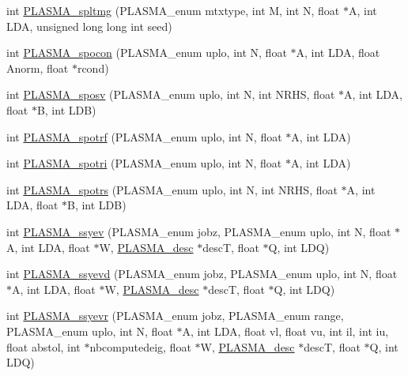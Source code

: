\begin{DoxyCompactItemize}
\item 
int \hyperlink{group__float_gaf78afc5a8cd9c1f43eb9cfecd9c0f7a1_gaf78afc5a8cd9c1f43eb9cfecd9c0f7a1}{P\+L\+A\+S\+M\+A\+\_\+spltmg} (P\+L\+A\+S\+M\+A\+\_\+enum mtxtype, int M, int N, float $\ast$A, int L\+D\+A, unsigned long long int seed)
\item 
int \hyperlink{group__float_gae4ca020dbb8fa3516e2e4c89a6b60b1a_gae4ca020dbb8fa3516e2e4c89a6b60b1a}{P\+L\+A\+S\+M\+A\+\_\+spocon} (P\+L\+A\+S\+M\+A\+\_\+enum uplo, int N, float $\ast$A, int L\+D\+A, float Anorm, float $\ast$rcond)
\item 
int \hyperlink{group__float_ga113c09b4a9f41fc4c19358a52477d685_ga113c09b4a9f41fc4c19358a52477d685}{P\+L\+A\+S\+M\+A\+\_\+sposv} (P\+L\+A\+S\+M\+A\+\_\+enum uplo, int N, int N\+R\+H\+S, float $\ast$A, int L\+D\+A, float $\ast$B, int L\+D\+B)
\item 
int \hyperlink{group__float_ga3ada27ebefe8e378bc6f9d25ab72d217_ga3ada27ebefe8e378bc6f9d25ab72d217}{P\+L\+A\+S\+M\+A\+\_\+spotrf} (P\+L\+A\+S\+M\+A\+\_\+enum uplo, int N, float $\ast$A, int L\+D\+A)
\item 
int \hyperlink{group__float_gaf35cf8d73bf326a683f4be4943ef9b38_gaf35cf8d73bf326a683f4be4943ef9b38}{P\+L\+A\+S\+M\+A\+\_\+spotri} (P\+L\+A\+S\+M\+A\+\_\+enum uplo, int N, float $\ast$A, int L\+D\+A)
\item 
int \hyperlink{group__float_gab813bd6d81c21feae7ce6553c9ba255a_gab813bd6d81c21feae7ce6553c9ba255a}{P\+L\+A\+S\+M\+A\+\_\+spotrs} (P\+L\+A\+S\+M\+A\+\_\+enum uplo, int N, int N\+R\+H\+S, float $\ast$A, int L\+D\+A, float $\ast$B, int L\+D\+B)
\item 
int \hyperlink{group__float_ga92b57475b852b71b42bc39cd0d1ec356_ga92b57475b852b71b42bc39cd0d1ec356}{P\+L\+A\+S\+M\+A\+\_\+ssyev} (P\+L\+A\+S\+M\+A\+\_\+enum jobz, P\+L\+A\+S\+M\+A\+\_\+enum uplo, int N, float $\ast$A, int L\+D\+A, float $\ast$W, \hyperlink{structplasma__desc__t}{P\+L\+A\+S\+M\+A\+\_\+desc} $\ast$desc\+T, float $\ast$Q, int L\+D\+Q)
\item 
int \hyperlink{group__float_ga71305bb114c063946ddd9003bea058bf_ga71305bb114c063946ddd9003bea058bf}{P\+L\+A\+S\+M\+A\+\_\+ssyevd} (P\+L\+A\+S\+M\+A\+\_\+enum jobz, P\+L\+A\+S\+M\+A\+\_\+enum uplo, int N, float $\ast$A, int L\+D\+A, float $\ast$W, \hyperlink{structplasma__desc__t}{P\+L\+A\+S\+M\+A\+\_\+desc} $\ast$desc\+T, float $\ast$Q, int L\+D\+Q)
\item 
int \hyperlink{group__float_ga850dfaa20a85559bd1ef0042e4218ecd_ga850dfaa20a85559bd1ef0042e4218ecd}{P\+L\+A\+S\+M\+A\+\_\+ssyevr} (P\+L\+A\+S\+M\+A\+\_\+enum jobz, P\+L\+A\+S\+M\+A\+\_\+enum range, P\+L\+A\+S\+M\+A\+\_\+enum uplo, int N, float $\ast$A, int L\+D\+A, float vl, float vu, int il, int iu, float abstol, int $\ast$nbcomputedeig, float $\ast$W, \hyperlink{structplasma__desc__t}{P\+L\+A\+S\+M\+A\+\_\+desc} $\ast$desc\+T, float $\ast$Q, int L\+D\+Q)

\end{DoxyCompactItemize}
